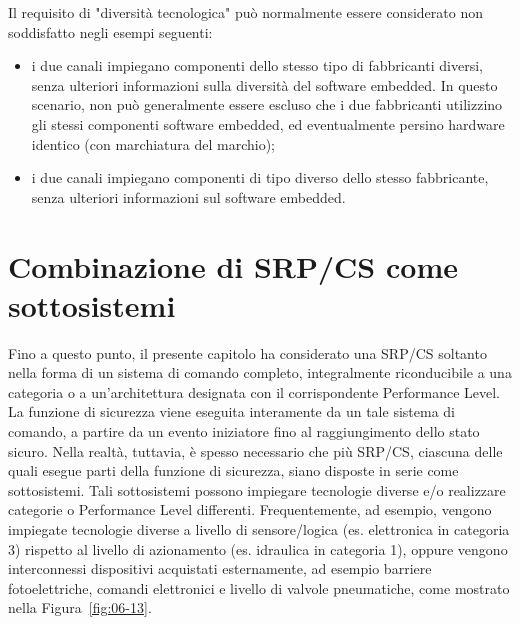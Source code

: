 Il requisito di "diversità tecnologica" può normalmente essere considerato non soddisfatto negli esempi seguenti:
\begin{itemize}
    \item i due canali impiegano componenti dello stesso tipo di fabbricanti diversi, senza ulteriori informazioni sulla diversità del software embedded. In questo scenario, non può generalmente essere escluso che i due fabbricanti utilizzino gli stessi componenti software embedded, ed eventualmente persino hardware identico (con marchiatura del marchio);
    \item i due canali impiegano componenti di tipo diverso dello stesso fabbricante, senza ulteriori informazioni sul software embedded.
\end{itemize}

\section{Combinazione di SRP/CS come sottosistemi}
\label{sec:06-4}
Fino a questo punto, il presente capitolo ha considerato una SRP/CS soltanto nella forma di un sistema di comando completo, integralmente riconducibile a una categoria o a un'architettura designata con il corrispondente Performance Level. La funzione di sicurezza viene eseguita interamente da un tale sistema di comando, a partire da un evento iniziatore fino al raggiungimento dello stato sicuro. Nella realtà, tuttavia, è spesso necessario che più SRP/CS, ciascuna delle quali esegue parti della funzione di sicurezza, siano disposte in serie come sottosistemi. Tali sottosistemi possono impiegare tecnologie diverse e/o realizzare categorie o Performance Level differenti. Frequentemente, ad esempio, vengono impiegate tecnologie diverse a livello di sensore/logica (es. elettronica in categoria 3) rispetto al livello di azionamento (es. idraulica in categoria 1), oppure vengono interconnessi dispositivi acquistati esternamente, ad esempio barriere fotoelettriche, comandi elettronici e livello di valvole pneumatiche, come mostrato nella Figura~\ref{fig:06-13}.

\begin{center}
    \begin{minipage}{\textwidth}
        \centering
        \captionsetup{hypcap=false}
        \resizebox{0.9\textwidth}{!}{}
        \label{fig:06-13}
    \end{minipage}
\end{center}

